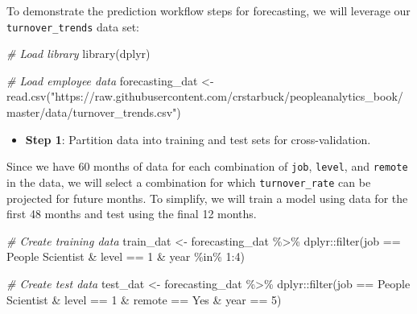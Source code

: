 \documentclass[
]{book}
\newenvironment{Shaded}{\begin{snugshade}}{\end{snugshade}}
\newcommand{\CommentTok}[1]{\textcolor[rgb]{0.56,0.35,0.01}{\textit{#1}}}
\newcommand{\DecValTok}[1]{\textcolor[rgb]{0.00,0.00,0.81}{#1}}
\newcommand{\FunctionTok}[1]{\textcolor[rgb]{0.00,0.00,0.00}{#1}}
\newcommand{\NormalTok}[1]{#1}
\newcommand{\OtherTok}[1]{\textcolor[rgb]{0.56,0.35,0.01}{#1}}
\newcommand{\SpecialCharTok}[1]{\textcolor[rgb]{0.00,0.00,0.00}{#1}}
\newcommand{\StringTok}[1]{\textcolor[rgb]{0.31,0.60,0.02}{#1}}
\providecommand{\tightlist}{%
  \setlength{\itemsep}{0pt}\setlength{\parskip}{0pt}}
\begin{document}
To demonstrate the prediction workflow steps for forecasting, we will leverage our \texttt{turnover\_trends} data set:

\begin{Shaded}
\begin{Highlighting}[]
\CommentTok{\# Load library}
\FunctionTok{library}\NormalTok{(dplyr)}

\CommentTok{\# Load employee data}
\NormalTok{forecasting\_dat }\OtherTok{\textless{}{-}} \FunctionTok{read.csv}\NormalTok{(}\StringTok{"https://raw.githubusercontent.com/crstarbuck/peopleanalytics\_book/master/data/turnover\_trends.csv"}\NormalTok{)}
\end{Highlighting}
\end{Shaded}

\begin{itemize}
\tightlist
\item
  \textbf{Step 1}: Partition data into training and test sets for cross-validation.
\end{itemize}

Since we have 60 months of data for each combination of \texttt{job}, \texttt{level}, and \texttt{remote} in the data, we will select a combination for which \texttt{turnover\_rate} can be projected for future months. To simplify, we will train a model using data for the first 48 months and test using the final 12 months.

\begin{Shaded}
\begin{Highlighting}[]
\CommentTok{\# Create training data}
\NormalTok{train\_dat }\OtherTok{\textless{}{-}}\NormalTok{ forecasting\_dat }\SpecialCharTok{\%\textgreater{}\%}\NormalTok{ dplyr}\SpecialCharTok{::}\FunctionTok{filter}\NormalTok{(job }\SpecialCharTok{==} \StringTok{\textquotesingle{}People Scientist\textquotesingle{}} \SpecialCharTok{\&}\NormalTok{ level }\SpecialCharTok{==} \DecValTok{1} \SpecialCharTok{\&}\NormalTok{ year }\SpecialCharTok{\%in\%} \DecValTok{1}\SpecialCharTok{:}\DecValTok{4}\NormalTok{)}

\CommentTok{\# Create test data}
\NormalTok{test\_dat }\OtherTok{\textless{}{-}}\NormalTok{ forecasting\_dat }\SpecialCharTok{\%\textgreater{}\%}\NormalTok{ dplyr}\SpecialCharTok{::}\FunctionTok{filter}\NormalTok{(job }\SpecialCharTok{==} \StringTok{\textquotesingle{}People Scientist\textquotesingle{}} \SpecialCharTok{\&}\NormalTok{ level }\SpecialCharTok{==} \DecValTok{1} \SpecialCharTok{\&}\NormalTok{ remote }\SpecialCharTok{==} \StringTok{\textquotesingle{}Yes\textquotesingle{}} \SpecialCharTok{\&}\NormalTok{ year }\SpecialCharTok{==} \DecValTok{5}\NormalTok{)}
\end{Highlighting}
\end{Shaded}
\end{document}
